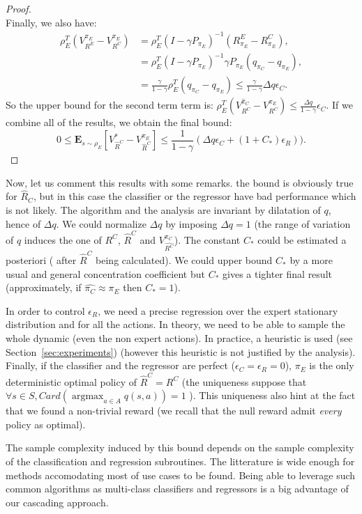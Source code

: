 \documentclass[smallextended]{svjour3}
\newcommand{\E}{\mathbf{E}}
\newcommand{\argmax}{\operatorname*{argmax}} %
\begin{document}
\begin{proof}
\begin{equation}
\end{equation}
Finally, we also have:
\begin{align}
\rho_E^T(V^{\pi_E}_{R^E}-V^{\pi_E}_{R^C})&=\rho_E^T(I-\gamma P_{\pi_E})^{-1}(R^E_{\pi_E}-R^C_{\pi_E}),
\\
&=\rho_E^T(I-\gamma P_{\pi_E})^{-1}\gamma P_{\pi_E}(q_{\pi_C}-q_{\pi_E}),
\\
&=\frac{\gamma}{1-\gamma}\rho_E^T(q_{\pi_C}-q_{\pi_E})\leq \frac{\gamma}{1-\gamma}\Delta q \epsilon_C.
\end{align}
So the upper bound for the second term term is: $\rho_E^T(V^{\hat{\pi}_C}_{R^C}-V^{\pi_E}_{R^C})\leq \frac{\Delta q}{1-\gamma}\epsilon_C$.
If we combine all of the results, we obtain the final bound:
\begin{equation}
0\leq\E_{s\sim\rho_E}[V^*_{\hat{R}^C}-V^{\pi_E}_{\hat{R}^C}]\leq \frac{1}{1-\gamma}(\Delta q \epsilon_C+(1+C_*)\epsilon_R)).
\end{equation}
\end{proof}

Now, let us comment this results with some remarks. the bound is obviously true for $\hat{R}_C$, but in this case the classifier or the regressor have bad performance which is not likely. The algorithm and the analysis are invariant by  dilatation of $q$, hence of $\Delta q$. We could normalize $\Delta q$ by imposing $\Delta q=1$ (the range of variation of $q$ induces the one of $R^C$, $\hat{R}^C$ and $V^{\pi_C}_{\hat{R^C}}$). The constant $C_*$ could be estimated a posteriori ( after $\hat{R}^C$ being calculated). We could upper bound $C_*$ by a more usual and general concentration coefficient but $C_*$ gives a tighter final result (approximately, if $\hat{\pi_C}\approx\pi_E$ then $C_*=1$).

In order to control $\epsilon_R$, we need a precise regression over the expert stationary distribution and for all the actions. In theory, we need to be able to sample the whole dynamic (even the non expert actions). In practice, a heuristic is used (see Section~\ref{sec:experiments}) (however this heuristic is not justified by the analysis).
Finally, if the classifier and the regressor are perfect ($\epsilon_C=\epsilon_R=0$), $\pi_E$ is the only deterministic optimal policy of $\hat{R}^C=R^C$ (the uniqueness suppose that $\forall s\in S, Card(\argmax_{a\in A}q(s,a))=1$ ). This uniqueness also hint at the fact that we found a non-trivial reward (we recall that the null reward admit \emph{every} policy as optimal).

The sample complexity induced by this bound depends on the sample complexity of the classification and regression subroutines. The litterature is wide enough for methods accomodating most of use cases to be found. Being able to leverage such common algorithms as multi-class classifiers and regressors is a big advantage of our cascading approach.
\end{document}
